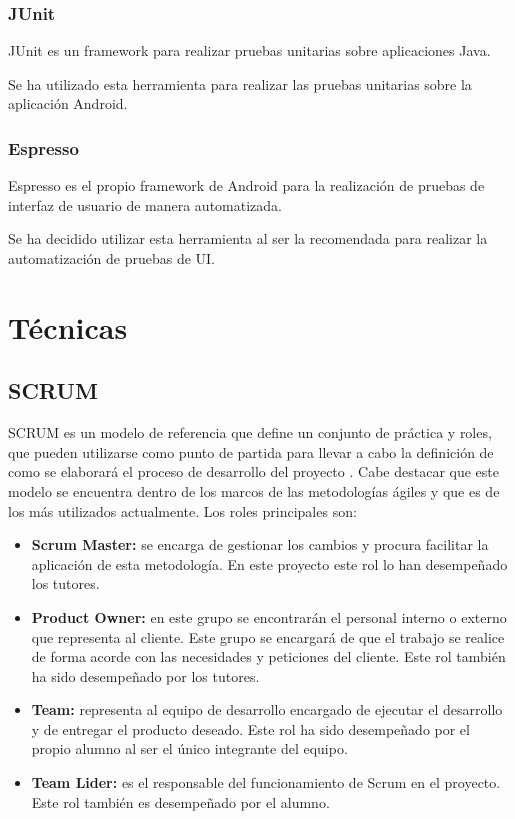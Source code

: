 \subsubsection{JUnit}

JUnit es un framework para realizar pruebas unitarias sobre aplicaciones Java. \cite{wiki:junit}

Se ha utilizado esta herramienta para realizar las pruebas unitarias sobre la aplicación Android.

\subsubsection{Espresso}

Espresso es el propio framework de Android para la realización de pruebas de interfaz de usuario de manera automatizada. \cite{wiki:espresso}

Se ha decidido utilizar esta herramienta al ser la recomendada para realizar la automatización de pruebas de UI.

\section{Técnicas}

\subsection{SCRUM}\label{scrum} 

SCRUM es un modelo de referencia que define un conjunto de práctica y roles, que pueden utilizarse como punto de partida para llevar a cabo la definición de como se elaborará el proceso de desarrollo del proyecto \cite{wiki:scrum}. Cabe destacar que este modelo se encuentra dentro de los marcos de las metodologías ágiles y que es de los más utilizados actualmente.
Los roles principales son:

\begin{itemize}

	\item \textbf{Scrum Master:} se encarga de gestionar los cambios y procura facilitar la aplicación de esta metodología. En este proyecto este rol lo han desempeñado los tutores.
	
	\item \textbf{Product Owner:} en este grupo se encontrarán el personal interno o externo que representa al cliente. Este grupo se encargará de que el trabajo se realice de forma acorde con las necesidades y peticiones del cliente. Este rol también ha sido desempeñado por los tutores.
	
	\item \textbf{Team:} representa al equipo de desarrollo encargado de ejecutar el desarrollo y de entregar el producto deseado. Este rol ha sido desempeñado por el propio alumno al ser el único integrante del equipo.
	
	\item \textbf{Team Lider:} es el responsable del funcionamiento de Scrum en el proyecto. Este rol también es desempeñado por el alumno.

\end{itemize}
 
